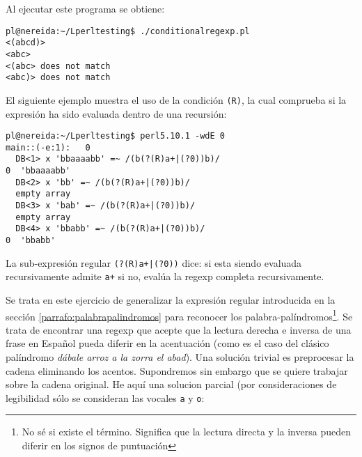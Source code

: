 Al ejecutar este programa se obtiene:
\begin{verbatim}
pl@nereida:~/Lperltesting$ ./conditionalregexp.pl
<(abcd)>
<abc>
<(abc> does not match
<abc)> does not match
\end{verbatim}


El siguiente ejemplo muestra el uso de la condición \verb|(R)|, la cual comprueba 
si la expresión ha sido evaluada dentro de una recursión:
\begin{verbatim}
pl@nereida:~/Lperltesting$ perl5.10.1 -wdE 0
main::(-e:1):   0
  DB<1> x 'bbaaaabb' =~ /(b(?(R)a+|(?0))b)/
0  'bbaaaabb'
  DB<2> x 'bb' =~ /(b(?(R)a+|(?0))b)/
  empty array
  DB<3> x 'bab' =~ /(b(?(R)a+|(?0))b)/
  empty array
  DB<4> x 'bbabb' =~ /(b(?(R)a+|(?0))b)/
0  'bbabb'
\end{verbatim}
La sub-expresión regular \verb#(?(R)a+|(?0))# dice:
si  esta siendo evaluada recursivamente admite \verb|a+|
si no, evalúa la regexp completa recursivamente.


Se trata en este ejercicio de generalizar la expresión
regular introducida en la sección
\ref{parrafo:palabrapalindromos}
para reconocer los palabra-palíndromos\footnote{
No sé si existe el término. Significa que 
la lectura directa y la inversa 
pueden diferir en los signos de puntuación
}. Se trata de encontrar una regexp que acepte
que la lectura derecha e inversa de una frase en Español
pueda diferir en la acentuación (como es el caso
del clásico palíndromo {\it dábale arroz a la zorra 
el abad}). Una solución trivial es preprocesar 
la cadena eliminando los acentos. Supondremos sin embargo
que se quiere trabajar sobre la cadena original.
He aquí una solucion parcial (por
consideraciones de legibilidad sólo se consideran las vocales \verb|a|
y \verb|o|:


